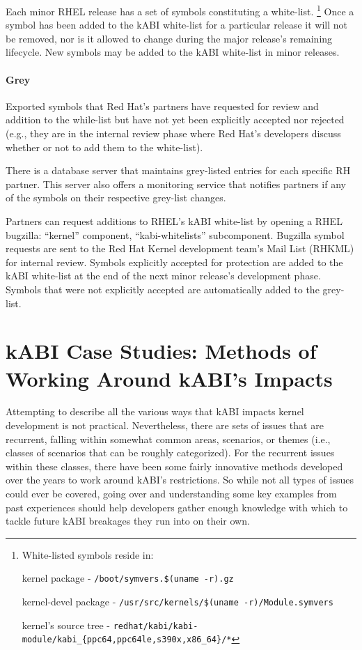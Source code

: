 \documentclass[10pt,oneside,english]{book}
\begin{document}
Each minor RHEL release has a set of symbols constituting a white-list.
\footnote{White-listed symbols reside in:

kernel package - \texttt{/boot/symvers.\$(uname -r).gz}

kernel-devel package - \texttt{/usr/src/kernels/\$(uname -r)/Module.symvers}

kernel's source tree - \texttt{redhat/kabi/kabi-module/kabi\_\{ppc64,ppc64le,s390x,x86\_64\}/{*}}} Once a symbol has been added to the kABI white-list for a particular
release it will not be removed, nor is it allowed to change during
the major release's remaining lifecycle. New symbols may be added
to the kABI white-list in minor releases.

\subsubsection{Grey}

Exported symbols that Red Hat's partners have requested for review
and addition to the while-list but have not yet been explicitly accepted
nor rejected (e.g., they are in the internal review phase where Red
Hat's developers discuss whether or not to add them to the white-list).

There is a database server that maintains grey-listed entries for
each specific RH partner. This server also offers a monitoring service
that notifies partners if any of the symbols on their respective grey-list
changes.

Partners can request additions to RHEL's kABI white-list by opening
a RHEL bugzilla: ``kernel'' component, ``kabi-whitelists'' subcomponent.
Bugzilla symbol requests are sent to the Red Hat Kernel development
team's Mail List (RHKML) for internal review. Symbols explicitly accepted
for protection are added to the kABI white-list at the end of the
next minor release's development phase. Symbols that were not explicitly
accepted are automatically added to the grey-list.

\chapter{kABI Case Studies: Methods of Working Around kABI's Impacts \label{chap:kABI-Case-Studies}}

Attempting to describe all the various ways that kABI impacts kernel
development is not practical. Nevertheless, there are sets of issues
that are recurrent, falling within somewhat common areas, scenarios,
or themes (i.e., classes of scenarios that can be roughly categorized).
For the recurrent issues within these classes, there have been some
fairly innovative methods developed over the years to work around
kABI's restrictions. So while not all types of issues could ever be
covered, going over and understanding some key examples from past
experiences should help developers gather enough knowledge with which
to tackle future kABI breakages they run into on their own.
\end{document}
